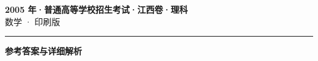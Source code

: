 \documentclass[zihao=5, a4paper]{ctexart}
\begin{document}
\begin{center}
  {\Large\bfseries 2005 年·普通高等学校招生考试·江西卷·理科}\\[4pt]
  {\large 数学 · 印刷版}
\end{center}
\medskip
{}

\par\bigskip\hrule\bigskip
{}
\begin{center}{\large\bfseries 参考答案与详细解析}\end{center}
\smallskip

\end{document}
